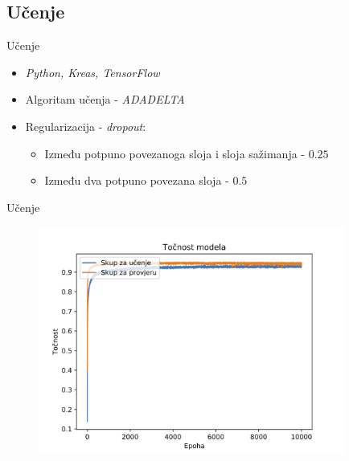 \documentclass{beamer}
\begin{document}
\subsection{Učenje}
\begin{frame}{Učenje}
\begin{itemize}
    \item \emph{Python, Kreas, TensorFlow} 
    \pause
    \item Algoritam učenja - \emph{ADADELTA}
    \pause
    \item Regularizacija - \emph{dropout}:
        \begin{itemize}
            \item Između potpuno povezanoga sloja i sloja sažimanja - $0.25$
            \item Između dva potpuno povezana sloja - $0.5$
        \end{itemize}
\end{itemize}
\begin{figure}
\centering
{}
\end{figure} 
\end{frame}

\begin{frame}{Učenje}
\begin{figure}[htb]
    \centering
    \includegraphics[width=10cm]{model_acc.png}
    \end{figure}
\end{frame}
\end{document}

